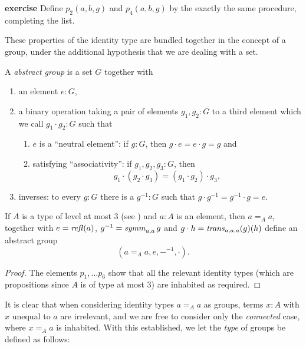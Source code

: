 {\bf  exercise}
  Define $p_2(a,b,g)$ and $p_4(a,b,g)$ by the exactly the same procedure, completing the list.

These properties of the identity type are bundled together in the concept of a group, under the additional hypothesis that we are dealing with a set.

  \begin{definition}\label{def:abstractgroup}
    A {\em abstract group} is a set $G$ together with
\begin{enumerate}
\item an element $e:G$, 
\item a binary operation taking a pair of elements $g_1,g_2:G$ to a third element which we call $g_1\cdot g_2:G$ such that
  \begin{enumerate}
  \item $e$ is a ``neutral element'': if $g:G$, then $g\cdot e=e\cdot g=g$ and
  \item satisfying ``associativity'': if $g_1,g_2,g_3:G$, then 
$$g_1\cdot(g_2\cdot g_3)=(g_1\cdot g_2)\cdot g_3,$$
  \end{enumerate}
\item inverses: to every $g:G$ there is a $g^{-1}:G$ such that $g\cdot g^{-1}=g^{-1}\cdot g=e$.
\end{enumerate} 
  \end{definition}

  \begin{lemma}\label{lem:idtypesgiveabstractgroups}
    If $A$ is a type of level at most 3 (see ) and $a:A$ is an element, then $a=_Aa$, together with $e=\mathop{{\it refl}}(a)$, $g^{-1}=\mathop{{\it symm}}_{a,a}g$ and $g\cdot h=\mathop{{\it trans}}_{a,a,a}(g)(h)$ define an abstract group 
$$(a=_Aa,e,{-}^{-1},\cdot).$$
  \end{lemma}
  \begin{proof}
    The elements $p_1,\dots p_6$ show that all the relevant identity types (which are propositions since $A$ is of type at most $3$) are inhabited as required.
  \end{proof}


\newcommand{\typegroup}{\mathbf{Groups}}
\newcommand{\typeset}{\mathbf{Sets}}
\newcommand{\iscontr}{\mathrm{isContr}}
\newcommand{\isset}{\mathrm{isSet}}
\newcommand{\isonetype}{\mathrm{1Type}}
\newcommand{\isconn}{\mathrm{isConn}}
\newcommand{\conn}{\mathrm{conn}}
\newcommand{\aut}{\mathrm{Aut}}
\newcommand{\Hom}{\mathrm{Hom}}

It is clear that when considering identity types $a=_Aa$ as groups, terms $x:A$ with $x$ unequal to $a$ are irrelevant, and we are free to consider only the {\em connected} case, \ie where $x=_Aa$ is inhabited.
With this established, we let the {\em type} of groups be defined as follows:

